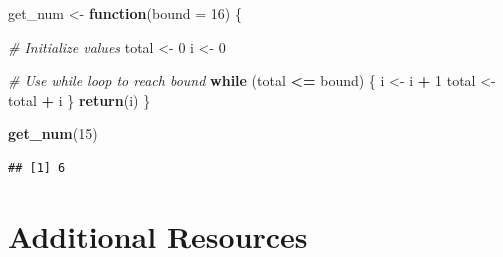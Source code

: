 \documentclass[
]{book}
\newenvironment{Shaded}{\begin{snugshade}}{\end{snugshade}}
\newcommand{\CommentTok}[1]{\textcolor[rgb]{0.56,0.35,0.01}{\textit{#1}}}
\newcommand{\ControlFlowTok}[1]{\textcolor[rgb]{0.13,0.29,0.53}{\textbf{#1}}}
\newcommand{\DataTypeTok}[1]{\textcolor[rgb]{0.13,0.29,0.53}{#1}}
\newcommand{\DecValTok}[1]{\textcolor[rgb]{0.00,0.00,0.81}{#1}}
\newcommand{\KeywordTok}[1]{\textcolor[rgb]{0.13,0.29,0.53}{\textbf{#1}}}
\newcommand{\NormalTok}[1]{#1}
\newcommand{\OperatorTok}[1]{\textcolor[rgb]{0.81,0.36,0.00}{\textbf{#1}}}
\newcommand{\StringTok}[1]{\textcolor[rgb]{0.31,0.60,0.02}{#1}}
\begin{document}
\begin{Shaded}
\begin{Highlighting}[]
\NormalTok{get_num <-}\StringTok{ }\ControlFlowTok{function}\NormalTok{(}\DataTypeTok{bound =} \DecValTok{16}\NormalTok{) \{}

    \CommentTok{# Initialize values}
\NormalTok{    total <-}\StringTok{ }\DecValTok{0}
\NormalTok{    i <-}\StringTok{ }\DecValTok{0}

    \CommentTok{# Use while loop to reach bound}
    \ControlFlowTok{while}\NormalTok{ (total }\OperatorTok{<=}\StringTok{ }\NormalTok{bound) \{}
\NormalTok{        i <-}\StringTok{ }\NormalTok{i }\OperatorTok{+}\StringTok{ }\DecValTok{1}
\NormalTok{        total <-}\StringTok{ }\NormalTok{total }\OperatorTok{+}\StringTok{ }\NormalTok{i}
\NormalTok{    \}}
    \KeywordTok{return}\NormalTok{(i)}
\NormalTok{\}}

\KeywordTok{get_num}\NormalTok{(}\DecValTok{15}\NormalTok{)}
\end{Highlighting}
\end{Shaded}

\begin{verbatim}
## [1] 6
\end{verbatim}

\hypertarget{additional-resources-6}{%
\section{Additional Resources}\label{additional-resources-6}}
\end{document}
